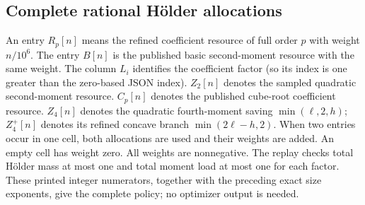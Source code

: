 \documentclass[11pt,letterpaper]{article}
\numberwithin{equation}{section}
\begin{document}
\subsection{Complete rational H\"older allocations}
An entry $R_p[n]$ means the refined coefficient resource of full order $p$
with weight $n/10^6$.  The entry $B[n]$ is the published basic second-moment
resource with the same weight.  The column $L_i$ identifies the coefficient factor
(so its index is one greater than the zero-based JSON index).
$Z_2[n]$ denotes the sampled quadratic second-moment resource.
$C_p[n]$ denotes the published cube-root coefficient resource.
$Z_4[n]$ denotes the quadratic fourth-moment saving $\min(\ell,2,h)$;
$Z_4^{+}[n]$ denotes its refined concave branch $\min(2\ell-h,2)$.
When two entries occur in one cell, both allocations are used and their
weights are added.  An empty cell has weight zero.  All weights are nonnegative.
The replay checks total H\"older mass at most one and total moment load at most one
for each factor.  These printed integer numerators, together with the preceding
exact size exponents, give the complete policy; no optimizer output is needed.
\end{document}
